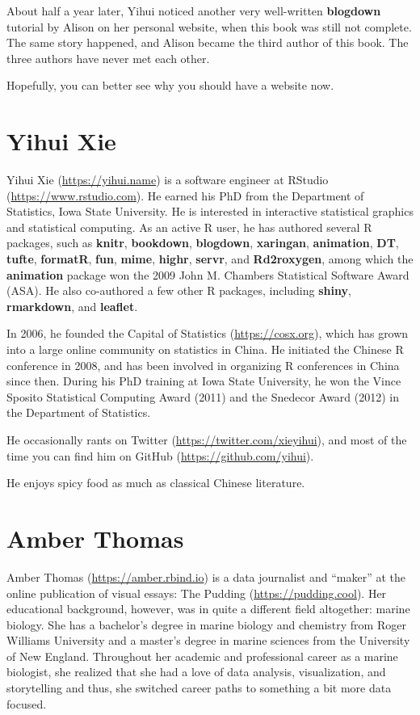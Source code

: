 \documentclass[12pt,]{krantz}
\theoremstyle{definition}
\theoremstyle{definition}
\theoremstyle{definition}
\theoremstyle{remark}
\begin{document}
About half a year later, Yihui noticed another very well-written
\textbf{blogdown} tutorial by Alison on her personal website, when this
book was still not complete. The same story happened, and Alison became
the third author of this book. The three authors have never met each
other.

Hopefully, you can better see why you should have a website now.

\hypertarget{yihui-xie}{%
\section*{Yihui Xie}\label{yihui-xie}}


Yihui Xie (\url{https://yihui.name}) is a software engineer at RStudio
(\url{https://www.rstudio.com}). He earned his PhD from the Department
of Statistics, Iowa State University. He is interested in interactive
statistical graphics and statistical computing. As an active R user, he
has authored several R packages, such as \textbf{knitr},
\textbf{bookdown}, \textbf{blogdown}, \textbf{xaringan},
\textbf{animation}, \textbf{DT}, \textbf{tufte}, \textbf{formatR},
\textbf{fun}, \textbf{mime}, \textbf{highr}, \textbf{servr}, and
\textbf{Rd2roxygen}, among which the \textbf{animation} package won the
2009 John M. Chambers Statistical Software Award (ASA). He also
co-authored a few other R packages, including \textbf{shiny},
\textbf{rmarkdown}, and \textbf{leaflet}.

In 2006, he founded the Capital of Statistics (\url{https://cosx.org}),
which has grown into a large online community on statistics in China. He
initiated the Chinese R conference in 2008, and has been involved in
organizing R conferences in China since then. During his PhD training at
Iowa State University, he won the Vince Sposito Statistical Computing
Award (2011) and the Snedecor Award (2012) in the Department of
Statistics.

He occasionally rants on Twitter (\url{https://twitter.com/xieyihui}),
and most of the time you can find him on GitHub
(\url{https://github.com/yihui}).

He enjoys spicy food as much as classical Chinese literature.

\hypertarget{amber-thomas}{%
\section*{Amber Thomas}\label{amber-thomas}}


Amber Thomas (\url{https://amber.rbind.io}) is a data journalist and
``maker'' at the online publication of visual essays: The Pudding
(\url{https://pudding.cool}). Her educational background, however, was
in quite a different field altogether: marine biology. She has a
bachelor's degree in marine biology and chemistry from Roger Williams
University and a master's degree in marine sciences from the University
of New England. Throughout her academic and professional career as a
marine biologist, she realized that she had a love of data analysis,
visualization, and storytelling and thus, she switched career paths to
something a bit more data focused.
\end{document}
